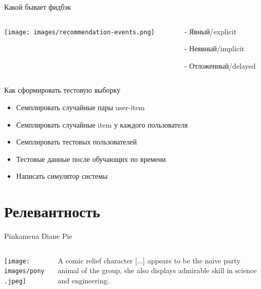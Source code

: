 \documentclass[11pt,aspectratio=169,handout]{beamer}
\begin{document}
\begin{frame}{Какой бывает фидбэк}

\begin{columns}
\begin{column}{0.55\textwidth}
   \begin{center}
     \texttt{[image: images/recommendation-events.png]}
  \end{center}
\end{column}
\begin{column}{0.4\textwidth}
    \begin{tcolorbox}[colback=gray!5,colframe=gray!80,title=Техническая метрика]
    \begin{itemize}%
    \item[-] Явный/explicit
    \item[-] Неявный/implicit
    \item[-] Отложенный/delayed
    \end{itemize}
    \end{tcolorbox}
\end{column}
\end{columns}

\end{frame}

\begin{frame}{Как сформировать тестовую выборку}

\begin{itemize} [<+->]
\item Семплировать случайные пары user-item
\item Семплировать случайные item у каждого пользователя 
\item Семплировать тестовых пользователей
\item Тестовые данные после обучающих по времени
\item Написать симулятор системы
\end{itemize}

\end{frame}

\section{Релевантность}

\begin{frame}{Pinkamena Diane Pie}

\begin{columns}
\begin{column}{0.4\textwidth}
   \begin{center}
		\texttt{[image: images/pony.jpeg]}
   \end{center}
\end{column}
\begin{column}{0.55\textwidth}
    \begin{tcolorbox}[colback=info!5,colframe=info!80,title=]
    A comic relief character [...] appears to be the naive party animal of the group, she also displays admirable skill in science and engineering.
    \end{tcolorbox}
\end{column}
\end{columns}

\end{frame}
\end{document}

